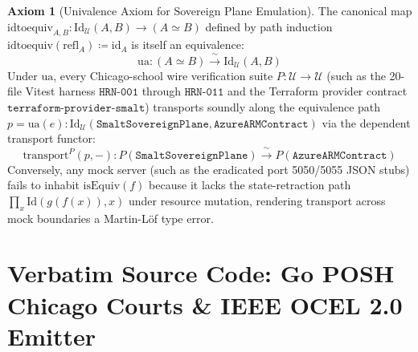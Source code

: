 \documentclass[10pt,twoside,openany]{book}
\theoremstyle{plain}
\theoremstyle{definition}
\newtheorem{axiom}[theorem]{Axiom}
\theoremstyle{remark}
\begin{document}
\begin{axiom}[Univalence Axiom for Sovereign Plane Emulation]
The canonical map $\mathrm{idtoequiv}_{A,B} : \mathrm{Id}_{\mathcal{U}}(A, B) \to (A \simeq B)$ defined by path induction $\mathrm{idtoequiv}(\mathrm{refl}_A) \coloneqq \mathrm{id}_A$ is itself an equivalence:
\begin{equation}
\mathrm{ua} : (A \simeq B) \xrightarrow{\;\sim\;} \mathrm{Id}_{\mathcal{U}}(A, B)
\end{equation}
Under $\mathrm{ua}$, every Chicago-school wire verification suite $P : \mathcal{U} \to \mathcal{U}$ (such as the 20-file Vitest harness $\mathtt{HRN\text{-}001}$ through $\mathtt{HRN\text{-}011}$ and the Terraform provider contract $\mathtt{terraform\text{-}provider\text{-}smalt}$) transports soundly along the equivalence path $p = \mathrm{ua}(e) : \mathrm{Id}_{\mathcal{U}}(\mathtt{SmaltSovereignPlane}, \mathtt{AzureARMContract})$ via the dependent transport functor:
\begin{equation}
\mathrm{transport}^P(p, -) : P(\mathtt{SmaltSovereignPlane}) \xrightarrow{\;\sim\;} P(\mathtt{AzureARMContract})
\end{equation}
Conversely, any mock server (such as the eradicated port 5050/5055 JSON stubs) fails to inhabit $\mathrm{isEquiv}(f)$ because it lacks the state-retraction path $\prod_{x} \mathrm{Id}(g(f(x)), x)$ under resource mutation, rendering transport across mock boundaries a Martin-Löf type error.
\end{axiom}

\appendix

\chapter{Verbatim Source Code: Go POSH Chicago Courts \& IEEE OCEL 2.0 Emitter}
\end{document}
